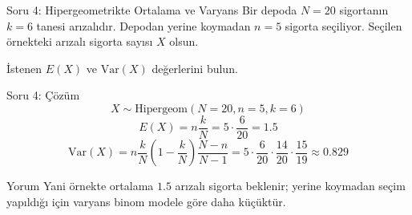 \documentclass[light]{lutbeamer}
\begin{document}
\begin{frame}{Soru 4: Hipergeometrikte Ortalama ve Varyans}
    \small
    Bir depoda \(N=20\) sigortanın \(k=6\) tanesi arızalıdır. Depodan yerine koymadan \(n=5\) sigorta seçiliyor. Seçilen örnekteki arızalı sigorta sayısı \(X\) olsun.

    \begin{block}{İstenen}
        \(E(X)\) ve \(\mathrm{Var}(X)\) değerlerini bulun.
    \end{block}
\end{frame}

\begin{frame}{Soru 4: Çözüm}
    \small
    \[
    X \sim \text{Hipergeom}(N=20,n=5,k=6)
    \]
    \[
    E(X)=n\frac{k}{N}=5\cdot\frac{6}{20}=1.5
    \]
    \[
    \mathrm{Var}(X)=n\frac{k}{N}\left(1-\frac{k}{N}\right)\frac{N-n}{N-1}
    =5\cdot\frac{6}{20}\cdot\frac{14}{20}\cdot\frac{15}{19}
    \approx 0.829
    \]

    \begin{exampleblock}{Yorum}
        Yani örnekte ortalama \(1.5\) arızalı sigorta beklenir; yerine koymadan seçim yapıldığı için varyans binom modele göre daha küçüktür.
    \end{exampleblock}
\end{frame}
\end{document}
